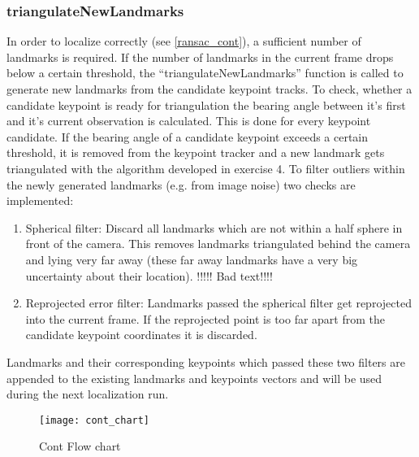 \subsubsection{triangulateNewLandmarks}
In order to localize correctly (see \cref{ransac_cont}), a sufficient number of landmarks is required. If the number of landmarks in the current frame drops below a certain threshold, the ``triangulateNewLandmarks'' function is called to generate new landmarks from the candidate keypoint tracks. To check, whether a candidate keypoint is ready for triangulation the bearing angle between it's first and it's current observation is calculated. This is done for every keypoint candidate. If the bearing angle of a candidate keypoint exceeds a certain threshold, it is removed from the keypoint tracker and a new landmark gets triangulated with the algorithm developed in exercise 4.
To filter outliers within the newly generated landmarks (e.g. from image noise) two checks are implemented:
\begin{enumerate}
	\item Spherical filter: Discard all landmarks which are not within a half sphere in front of the camera. This removes landmarks triangulated behind the camera and lying very far away (these far away landmarks have a very big uncertainty about their location). !!!!! Bad text!!!!
	\item Reprojected error filter: Landmarks passed the spherical filter get reprojected into the current frame. If the reprojected point is too far apart from the candidate keypoint coordinates it is discarded.
\end{enumerate}
Landmarks and their corresponding keypoints which passed these two filters are appended to the existing landmarks and keypoints vectors and will be used during the next localization run.

\begin{figure}[ht]
	\centering
	\texttt{[image: cont\_chart]}
	\caption{Cont Flow chart}
	\label{img_flow_cont}
\end{figure}